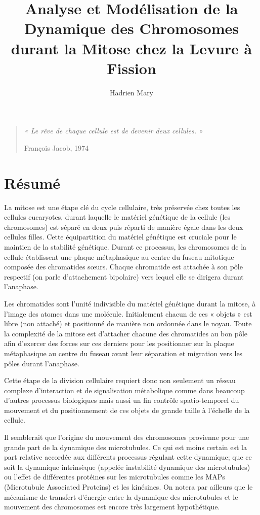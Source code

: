 \documentclass[12pt,a4paper,twoside,openright]{book}
\date{}
\title{Analyse et Modélisation de la Dynamique des Chromosomes durant la Mitose chez la Levure à Fission}
\author{Hadrien Mary}
\begin{document}
\makeflyleaf

\newpage

\pagestyle{empty}

\vspace*{\fill}

\begin{quote}
    {\centerline {\itshape « Le rêve de chaque cellule est de devenir deux cellules. »}}
    \centerline{François Jacob, 1974}
  \end{quote}\vspace*{\fill}

\newpage

\cleardoublepage
\section*{Résumé}

La mitose est une étape clé du cycle cellulaire, très préservée chez
toutes les cellules eucaryotes, durant laquelle le matériel génétique de
la cellule (les chromosomes) est séparé en deux puis réparti de manière
égale dans les deux cellules filles. Cette équipartition du matériel
génétique est cruciale pour le maintien de la stabilité génétique.
Durant ce processus, les chromosomes de la cellule établissent une
plaque métaphasique au centre du fuseau mitotique composée des
chromatides sœurs. Chaque chromatide est attachée à son pôle respectif
(on parle d'attachement bipolaire) vers lequel elle se dirigera durant
l'anaphase.

Les chromatides sont l'unité indivisible du matériel génétique durant la
mitose, à l'image des atomes dans une molécule. Initialement chacun de
ces « objets » est libre (non attaché) et positionné de manière non
ordonnée dans le noyau. Toute la complexité de la mitose est d'attacher
chacune des chromatides au bon pôle afin d'exercer des forces sur ces
derniers pour les positionner sur la plaque métaphasique au centre du
fuseau avant leur séparation et migration vers les pôles durant
l'anaphase.

Cette étape de la division cellulaire requiert donc non seulement un
réseau complexe d'interaction et de signalisation métabolique comme dans
beaucoup d'autres processus biologiques mais aussi un fin contrôle
spatio-temporel du mouvement et du positionnement de ces objets de
grande taille à l'échelle de la cellule.

Il semblerait que l'origine du mouvement des chromosomes provienne pour
une grande part de la dynamique des microtubules. Ce qui est moins
certain est la part relative accordée aux différents processus régulant
cette dynamique; que ce soit la dynamique intrinsèque (appelée
instabilité dynamique des microtubules) ou l'effet de différentes
protéines sur les microtubules comme les MAPs (Microtubule Associated
Proteins) et les kinésines. On notera par ailleurs que le mécanisme de
transfert d'énergie entre la dynamique des microtubules et le mouvement
des chromosomes est encore très largement hypothétique.
\end{document}
